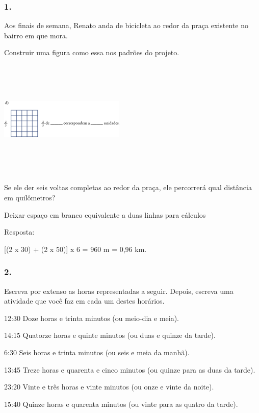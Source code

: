 \begin{enumerate}
\begin{escolha}
\begin{enumerate}
\begin{itemize}
\begin{itemize}
\begin{escolha}
\subsubsection{1.}\label{section-52}

Aos finais de semana, Renato anda de bicicleta ao redor da praça
existente no bairro em que mora.

Construir uma figura como essa nos padrões do projeto.

\includegraphics[width=2.35256in,height=2.20730in]{media/image61.png}

Se ele der seis voltas completas ao redor da praça, ele percorrerá qual
distância em quilômetros?

Deixar espaço em branco equivalente a duas linhas para cálculos

Resposta:

[(2 x 30) + (2 x 50)] x 6 = 960 m = 0,96 km.


\subsubsection{2.}\label{section-53}

Escreva por extenso as horas representadas a seguir. Depois, escreva uma atividade que você faz em cada um destes horários.

\begin{escolha}
  \item 12:30
  Doze horas e trinta minutos (ou meio-dia e meia).
  \item 14:15
  Quatorze horas e quinte minutos (ou duas e quinze da tarde).
  \item 6:30
  Seis horas e trinta minutos (ou seis e meia da manhã).
  \item 13:45
  Treze horas e quarenta e cinco minutos (ou quinze para as duas da tarde).
  \item 23:20
  Vinte e três horas e vinte minutos (ou onze e vinte da noite).
  \item 15:40
  Quinze horas e quarenta minutos (ou vinte para as quatro da tarde).
\end{escolha}


\end{escolha}
\end{itemize}
\end{itemize}
\end{enumerate}
\end{escolha}
\end{enumerate}
